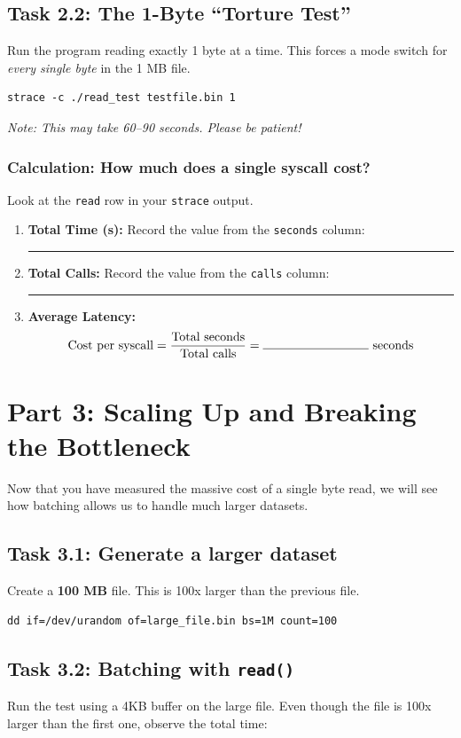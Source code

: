 \documentclass[11pt, a4paper]{article}
\begin{document}
\subsection*{Task 2.2: The 1-Byte ``Torture Test''}
Run the program reading exactly 1 byte at a time. This forces a mode switch for \textit{every single byte} in the 1 MB file. 

\begin{verbatim}
strace -c ./read_test testfile.bin 1
\end{verbatim}

\textit{Note: This may take 60--90 seconds. Please be patient!}

\subsubsection*{Calculation: How much does a single syscall cost?}
Look at the \texttt{read} row in your \texttt{strace} output. 

\begin{enumerate}
    \item \textbf{Total Time (s):} Record the value from the \texttt{seconds} column: \rule{2cm}{0.4pt}
    \item \textbf{Total Calls:} Record the value from the \texttt{calls} column: \rule{2cm}{0.4pt}
    \item \textbf{Average Latency:}
    \[ \text{Cost per syscall} = \frac{\text{Total seconds}}{\text{Total calls}} = \rule{3cm}{0.4pt} \text{ seconds} \]
\end{enumerate}

\section*{Part 3: Scaling Up and Breaking the Bottleneck}
Now that you have measured the massive cost of a single byte read, we will see how batching allows us to handle much larger datasets.

\subsection*{Task 3.1: Generate a larger dataset}

Create a \textbf{100 MB} file. This is 100x larger than the previous file.
\begin{verbatim}
dd if=/dev/urandom of=large_file.bin bs=1M count=100
\end{verbatim}

\subsection*{Task 3.2: Batching with \texttt{read()}}
Run the test using a 4KB buffer on the large file. Even though the file is 100x larger than the first one, observe the total time:
\end{document}
